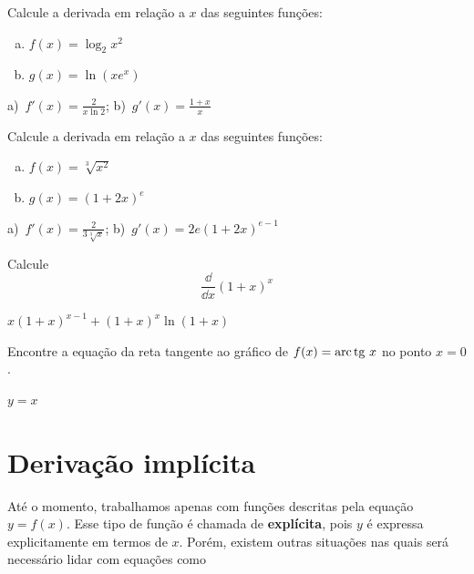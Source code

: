 \cleardoublepage\documentclass[../main.tex]{subfiles}
\begin{document}
\begin{exer}
  Calcule a derivada em relação a $x$ das seguintes funções:
  \begin{enumerate}[a)]
  \item $f(x) = \log_2 x^2$
  \item $g(x) = \ln (xe^x)$
  \end{enumerate}
\end{exer}
\begin{resp}
  a)~$\displaystyle f'(x) = \frac{2}{x\ln 2}$; b)~$g'(x) = \frac{1+x}{x}$
\end{resp}

\begin{exer}
  Calcule a derivada em relação a $x$ das seguintes funções:
  \begin{enumerate}[a)]
  \item $f(x) = \sqrt[3]{x^2}$
  \item $g(x) = (1+2x)^e$
  \end{enumerate}
\end{exer}
\begin{resp}
  a)~$\displaystyle f'(x) = \frac{2}{3\sqrt[3]{x}}$; b)~$g'(x) = 2e(1+2x)^{e-1}$
\end{resp}

\begin{exer}
  Calcule
  \begin{equation*}
    \frac{\dd}{\dd x} (1+x)^x
  \end{equation*}
\end{exer}
\begin{resp}
  $x(1+x)^{x-1} + (1+x)^x\ln(1+x)$
\end{resp}

\begin{exer}
  Encontre a equação da reta tangente ao gráfico de $f(x) = \operatorname{arc}\operatorname{tg}\, x$ no ponto $x=0$.
\end{exer}
\begin{resp}
  $y=x$
\end{resp}

\section{Derivação implícita}\hypertarget{DerivImplicita}{}\label{sec:DerivImplicita}
Até o momento, trabalhamos apenas com funções descritas pela equação \(y=f(x)\). Esse tipo de função é chamada de \textbf{explícita}, pois \(y\) é expressa explicitamente em termos de \(x\). Porém, existem outras situações nas quais será necessário lidar com equações como
\end{document}
